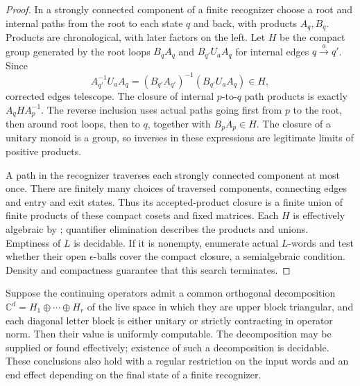 \documentclass[11pt]{article}
\theoremstyle{plain}
\theoremstyle{definition}
\theoremstyle{remark}
\begin{document}
\begin{proof}
In a strongly connected component of a finite recognizer choose a root and internal paths from the root to each state $q$ and back, with products $A_q,B_q$. Products are chronological, with later factors on the left. Let $H$ be the compact group generated by the root loops $B_qA_q$ and $B_{q'}U_aA_q$ for internal edges $q\xrightarrow{a}q'$. Since
\[
 A_{q'}^{-1}U_aA_q=(B_{q'}A_{q'})^{-1}(B_{q'}U_aA_q)\in H,
\]
corrected edges telescope. The closure of internal $p$-to-$q$ path products is exactly $A_qHA_p^{-1}$. The reverse inclusion uses actual paths going first from $p$ to the root, then around root loops, then to $q$, together with $B_pA_p\in H$. The closure of a unitary monoid is a group, so inverses in these expressions are legitimate limits of positive products.

A path in the recognizer traverses each strongly connected component at most once. There are finitely many choices of traversed components, connecting edges and entry and exit states. Thus its accepted-product closure is a finite union of finite products of these compact cosets and fixed matrices. Each $H$ is effectively algebraic by \cite{DJK05}; quantifier elimination describes the products and unions. Emptiness of $L$ is decidable. If it is nonempty, enumerate actual $L$-words and test whether their open $\epsilon$-balls cover the compact closure, a semialgebraic condition. Density and compactness guarantee that this search terminates.
\end{proof}

\begin{proposition}\label{prop:kw-block}
Suppose the continuing operators admit a common orthogonal decomposition $\mathbb C^d=H_1\oplus\cdots\oplus H_r$ of the live space in which they are upper block triangular, and each diagonal letter block is either unitary or strictly contracting in operator norm. Then their value is uniformly computable. The decomposition may be supplied or found effectively; existence of such a decomposition is decidable. These conclusions also hold with a regular restriction on the input words and an end effect depending on the final state of a finite recognizer.
\end{proposition}
\end{document}
